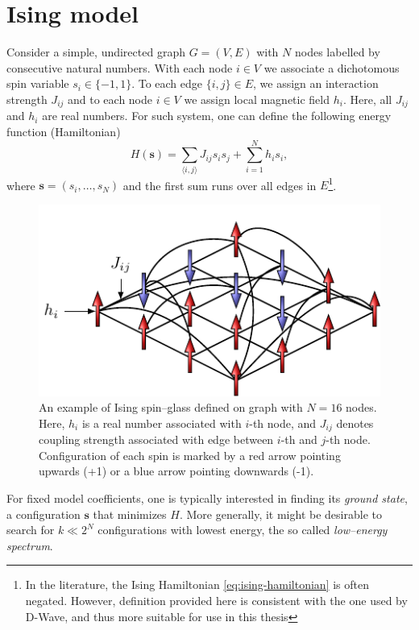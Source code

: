 \section{Ising model}
Consider a simple, undirected graph $G = (V, E)$ with $N$ nodes labelled by consecutive natural numbers. With each node $i \in V$ we associate a dichotomous spin variable $s_i \in \{-1, 1\}$. To each edge $\{i, j\} \in E$, we assign an interaction strength $J_{ij}$ and to each node $i \in V$ we assign local magnetic field $h_i$. Here, all $J_{ij}$ and $h_i$ are real numbers. For such system, one can define the following energy function (Hamiltonian)
\begin{equation}
\label{eq:ising-hamiltonian}
H(\mathbf{s}) = \sum_{\langle i, j \rangle} J_{ij} s_i s_j +  \sum_{i=1}^N h_i s_i,
\end{equation}
where $\mathbf{s} = (s_i, \ldots, s_N)$ and the first sum runs over all edges in $E$\footnote{In the literature, the Ising Hamiltonian \eqref{eq:ising-hamiltonian} is often negated. However, definition provided here is consistent with the one used by D-Wave, and thus more suitable for use in this thesis}.
\begin{figure}
    \centering
    \includegraphics{figures/spins.pdf}
    \caption{An example of Ising  spin--glass defined on graph with $N=16$ nodes. Here, $h_i$ is a real number associated with $i$-th node, and $J_{ij}$ denotes coupling strength associated with edge between $i$-th and $j$-th node. Configuration of each spin is marked by a red arrow pointing upwards (+1) or a blue arrow pointing downwards (-1).}
    \label{fig:my_label}
\end{figure}
For fixed model coefficients, one is typically interested in finding its \emph{ground state}, a configuration $\mathbf{s}$ that minimizes $H$. More generally, it might be desirable to search for $k \ll 2^N$ configurations with lowest energy, the so called \emph{low--energy spectrum}.

